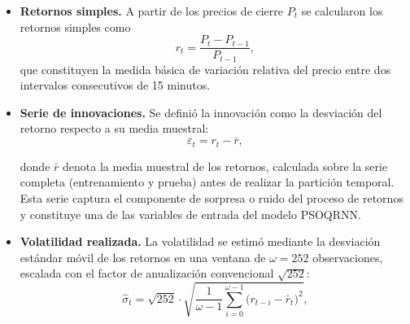 \documentclass[12pt]{paper}
\begin{document}
\begin{itemize}
    \item \textbf{Retornos simples.} A partir de los precios de cierre $P_t$ se calcularon los retornos simples como
    \begin{equation}
        r_t = \frac{P_t - P_{t-1}}{P_{t-1}},
    \end{equation}
    que constituyen la medida básica de variación relativa del precio entre dos intervalos consecutivos de 15 minutos.

    \item \textbf{Serie de innovaciones.} Se definió la innovación como la desviación del retorno respecto a su media muestral:
    \begin{equation}
        \varepsilon_t = r_t - \bar{r},
    \end{equation}

    donde $\bar{r}$ denota la media muestral de los retornos, calculada sobre la serie completa (entrenamiento y prueba) antes de realizar la partición temporal. Esta serie captura el componente de sorpresa o ruido del proceso de retornos y constituye una de las variables de entrada del modelo PSOQRNN.

    \item \textbf{Volatilidad realizada.} La volatilidad se estimó mediante la desviación estándar móvil de los retornos en una ventana de $\omega = 252$ observaciones, escalada con el factor de anualización convencional $\sqrt{252}$:
    \begin{equation}
        \hat{\sigma}_t = \sqrt{252} \cdot \sqrt{\frac{1}{\omega - 1}\sum_{i=0}^{\omega-1}\bigl(r_{t-i} - \bar{r}_{t}\bigr)^{2}},
    \end{equation}


\end{itemize}
\end{document}
